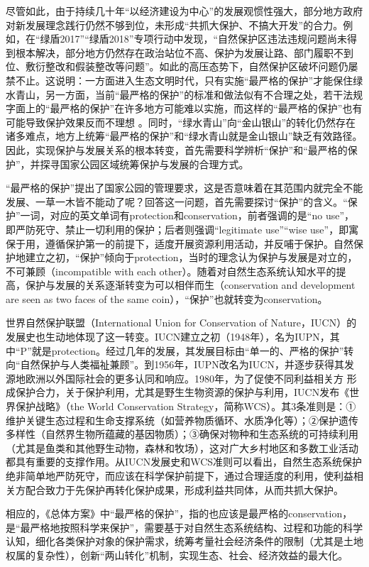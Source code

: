 \documentclass[
]{book}
\begin{document}
尽管如此，由于持续几十年``以经济建设为中心''的发展观惯性强大，部分地方政府对新发展理念践行仍然不够到位，未形成``共抓大保护、不搞大开发''的合力。例如，在``绿盾2017''``绿盾2018''专项行动中发现，``自然保护区违法违规问题尚未得到根本解决，部分地方仍然存在政治站位不高、保护为发展让路、部门履职不到位、敷衍整改和假装整改等问题''。如此的高压态势下，自然保护区破坏问题仍屡禁不止。这说明：一方面进入生态文明时代，只有实施``最严格的保护''才能保住绿水青山，另一方面，当前``最严格的保护''的标准和做法似有不合理之处，若干法规字面上的``最严格的保护''在许多地方可能难以实施，而这样的``最严格的保护''也有可能导致保护效果反而不理想 。同时，``绿水青山''向``金山银山''的转化仍然存在诸多难点，地方上统筹``最严格的保护''和``绿水青山就是金山银山''缺乏有效路径。因此，实现保护与发展关系的根本转变，首先需要科学辨析``保护''和``最严格的保护''，并探寻国家公园区域统筹保护与发展的合理方式。

``最严格的保护''提出了国家公园的管理要求，这是否意味着在其范围内就完全不能发展、一草一木皆不能动了呢？回答这一问题，首先需要探讨``保护''的含义。``保护''一词，对应的英文单词有protection和conservation，前者强调的是``no use''，即严防死守、禁止一切利用的保护；后者则强调``legitimate use''``wise use''，即寓保于用，遵循保护第一的前提下，适度开展资源利用活动，并反哺于保护。自然保护地建立之初，``保护''倾向于protection，当时的理念认为保护与发展是对立的，不可兼顾（incompatible with each other）。随着对自然生态系统认知水平的提高，保护与发展的关系逐渐转变为可以相伴而生（conservation and development are seen as two faces of the same coin），``保护''也就转变为conservation。

世界自然保护联盟（International Union for Conservation of Nature，IUCN）的发展史也生动地体现了这一转变。IUCN建立之初（1948年），名为IUPN，其中``P''就是protection。经过几年的发展，其发展目标由``单一的、严格的保护''转向``自然保护与人类福祉兼顾''。到1956年，IUPN改名为IUCN，并逐步获得其发源地欧洲以外国际社会的更多认同和响应。1980年，为了促使不同利益相关方 形成保护合力，关于保护利用，尤其是野生生物资源的保护与利用，IUCN发布《世界保护战略》（the World Conservation Strategy，简称WCS）。其3条准则是：①维护关键生态过程和生命支撑系统（如营养物质循环、水质净化等）；②保护遗传多样性（自然界生物所蕴藏的基因物质）；③确保对物种和生态系统的可持续利用（尤其是鱼类和其他野生动物，森林和牧场），这对广大乡村地区和多数工业活动都具有重要的支撑作用。从IUCN发展史和WCS准则可以看出，自然生态系统保护绝非简单地严防死守，而应该在科学保护前提下，通过合理适度的利用，使利益相关方配合致力于先保护再转化保护成果，形成利益共同体，从而共抓大保护。

相应的，《总体方案》中``最严格的保护''，指的也应该是最严格的conservation，是``最严格地按照科学来保护''，需要基于对自然生态系统结构、过程和功能的科学认知，细化各类保护对象的保护需求，统筹考量社会经济条件的限制（尤其是土地权属的复杂性），创新``两山转化''机制，实现生态、社会、经济效益的最大化。
\end{document}
